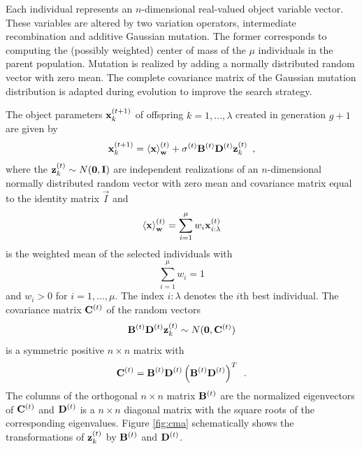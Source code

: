 Each individual represents an $n$-dimensional
real-valued object variable vector.  These variables are altered by
two variation operators, intermediate recombination and additive
Gaussian mutation.  The former corresponds to computing the 
(possibly weighted) center of
mass of the $\mu$ individuals in the parent population.  Mutation is
realized by adding a normally distributed random vector with zero
mean.  The complete covariance matrix of the Gaussian
mutation distribution is adapted during evolution to improve the
search strategy.  


The object parameters $\mathbf{x}_k^{(t+1)}$ of offspring
$k=1,\dots,\lambda$ created in generation $g+1$ are given by
\begin{equation}
\mathbf{x}_k^{(t+1)}=\left<{\mathbf{x}}\right>^{(t)}_{\mathbf{w}}+\sigma^{(t)}\mathbf{B}^{(t)}\mathbf{D}^{(t)}\mathbf{z}^{(t)}_k \enspace,
\end{equation}
where the $\mathbf{z}^{(t)}_k\sim {N}(\mathbf{0},\mathbf{I})$ are
independent realizations of an $n$-dimensional normally distributed
random vector with zero mean and covariance matrix equal to the
identity matrix $\vec{I}$ and
\begin{equation}
\left<{\mathbf{x}}\right>^{(t)}_{\mathbf{w}}=\sum_{i=1}^\mu
w_i \mathbf{x}_{i:\lambda}^{(t)}
\end{equation}
is the weighted mean of the selected individuals with
\begin{equation}\label{wnormal:eq}
\sum_{i=1}^\mu w_i = 1
\end{equation}
and $w_i>0$ for $i=1,\dots,\mu$. The index $i:\lambda$
denotes the $i$th best individual. 
%
The covariance matrix $\mathbf{C}^{(t)}$ of the random vectors
\begin{equation}
\mathbf{B}^{(t)}\mathbf{D}^{(t)}\mathbf{z}^{(t)}_k\sim {N}(\mathbf{0},\mathbf{C}^{(t)})
\end{equation}
is a symmetric positive $n\times n$ matrix with
\begin{equation}
{\mathbf{C}}^{(t)}=\mathbf{B}^{(t)}\mathbf{D}^{(t)}\left(\mathbf{B}^{(t)}\mathbf{D}^{(t)}\right)^T\enspace.
\end{equation}
The columns of the orthogonal $n\times n$ matrix $\mathbf{B}^{(t)}$ are
the normalized eigenvectors of ${\mathbf{C}}^{(t)}$ and $\mathbf{D}^{(t)}$
is a $n\times n$ diagonal matrix with the square roots of the
corresponding eigenvalues.  Figure \ref{fig:cma} schematically shows
the transformations of $\mathbf{z}^{(t)}_k$ by %
$\mathbf{B}^{(t)}$ and $\mathbf{D}^{(t)}$.
                                                                                                                                                                
